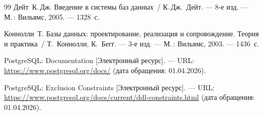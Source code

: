 {}

\begin{thebibliography}{99}
    Дейт~К.\,Дж. Введение в системы баз данных~/ К.\,Дж.~Дейт. --- 8-е изд. --- М.\,: Вильямс, 2005. --- 1328~с.

    Коннолли~Т. Базы данных: проектирование, реализация и сопровождение. Теория и практика~/ Т.~Коннолли, К.~Бегг. --- 3-е изд. --- М.\,: Вильямс, 2003. --- 1436~с.

    PostgreSQL: Documentation [Электронный ресурс]. --- URL: \url{https://www.postgresql.org/docs/} (дата обращения: 01.04.2026).

    PostgreSQL: Exclusion Constraints [Электронный ресурс]. --- URL: \url{https://www.postgresql.org/docs/current/ddl-constraints.html} (дата обращения: 01.04.2026).
\end{thebibliography}

\clearpage
